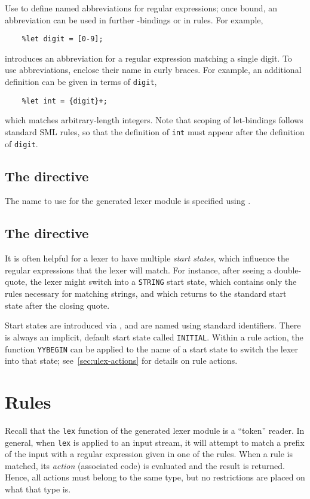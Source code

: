 Use  to define named abbreviations for regular expressions; once bound, an abbreviation can be used in further -bindings or in rules.  For example,
\begin{verbatim}
    %let digit = [0-9];
\end{verbatim}
introduces an abbreviation for a regular expression matching a single digit.  To use abbreviations, enclose their name in curly braces.  For example, an additional  definition can be given in terms of \texttt{digit},
\begin{verbatim}
    %let int = {digit}+;
\end{verbatim}
which matches arbitrary-length integers.  Note that scoping of let-bindings follows standard SML rules, so that the definition of \texttt{int} must appear after the definition of \texttt{digit}.

\subsection{The  directive}

The name to use for the generated lexer module is specified using .

\subsection{The  directive}

It is often helpful for a lexer to have multiple \emph{start states}, which influence the regular expressions that the lexer will match.  For instance, after seeing a double-quote, the lexer might switch into a \texttt{STRING} start state, which contains only the rules necessary for matching strings, and which returns to the standard start state after the closing quote.

Start states are introduced via , and are named using standard identifiers.  There is always an implicit, default start state called \texttt{INITIAL}.  Within a rule action, the function \texttt{YYBEGIN} can be applied to the name of a start state to switch the lexer into that state; see~\ref{sec:ulex-actions} for details on rule actions.

\section{Rules}\label{sec:ulex-rules}

Recall that the \texttt{lex} function of the generated lexer module is a ``token'' reader.  In general, when \texttt{lex} is applied to an input stream, it will attempt to match a prefix of the input with a regular expression given in one of the rules.  When a rule is matched, its \emph{action} (associated code) is evaluated and the result is returned.  Hence, all actions must belong to the same type, but no restrictions are placed on what that type is.

